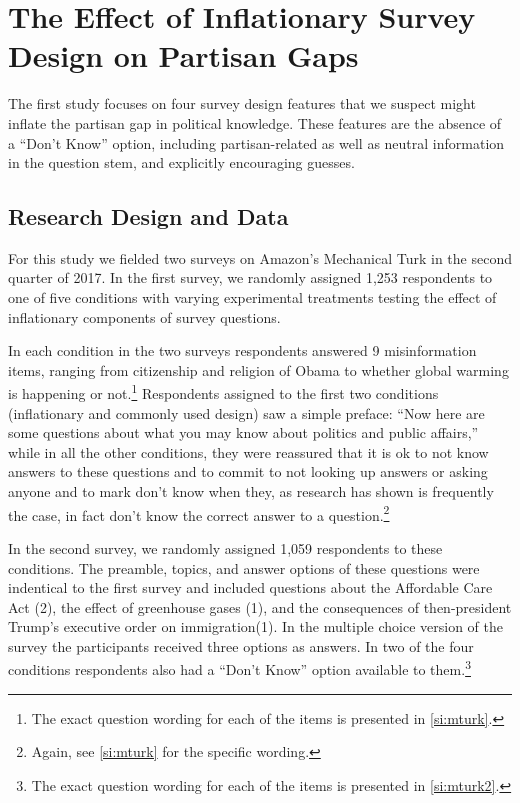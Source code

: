 \documentclass[12pt, letterpaper]{article}
\begin{document}
\section*{The Effect of Inflationary Survey Design on Partisan Gaps}
\label{sec:inflationary_measures}
The first study focuses on four survey design features that we suspect might inflate the partisan gap in political knowledge. These features are the absence of a ``Don't Know'' option, including partisan-related as well as neutral information in the question stem, and explicitly encouraging guesses.

\subsection*{Research Design and Data}\label{sec:data1}

For this study we fielded two surveys on Amazon's Mechanical Turk \citep{BerinskyHuberLenz2012} in the second quarter of 2017. In the first survey, we randomly assigned 1,253 respondents to one of five conditions with varying experimental treatments testing the effect of inflationary components of survey questions.

In each condition in the two surveys respondents answered 9 misinformation items, ranging from citizenship and religion of Obama to whether global warming is happening or not.\footnote{The exact question wording for each of the items is presented in \cref{si:mturk}.} Respondents assigned to the first two conditions (inflationary and commonly used design) saw a simple preface: ``Now here are some questions about what you may know about politics and public affairs,'' while in all the other conditions, they were reassured that it is ok to not know answers to these questions and to commit to not looking up answers or asking anyone and to mark don't know when they, as research has shown is frequently the case, in fact don’t know the correct answer to a question.\footnote{Again, see \cref{si:mturk} for the specific wording.}

In the second survey, we randomly assigned 1,059 respondents to these conditions. The preamble, topics, and answer options of these questions were indentical to the first survey and included questions about the Affordable Care Act (2), the effect of greenhouse gases (1), and the consequences of then-president Trump's executive order on immigration(1). In the multiple choice version of the survey the participants received three options as answers. In two of the four conditions respondents also had a ``Don't Know'' option available to them.\footnote{The exact question wording for each of the items is presented in \cref{si:mturk2}.}
\end{document}
